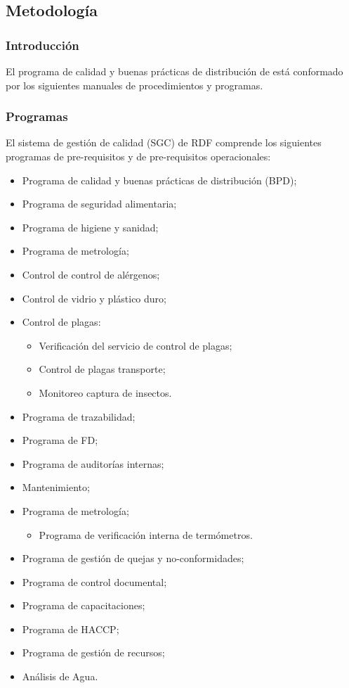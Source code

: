 \subsection{Metodología}

\subsubsection{Introducción}

El programa de calidad y buenas prácticas de distribución de  está conformado por los siguientes manuales de procedimientos y programas.

\subsubsection{Programas}
El sistema de gestión de calidad (SGC) de RDF comprende los siguientes programas de pre-requisitos y de pre-requisitos operacionales:
\begin{itemize}
	\item Programa de calidad y buenas prácticas de distribución (BPD);
	\item Programa de seguridad alimentaria;
	\item Programa de higiene y sanidad;
	\item Programa de metrología;
	\item Control de control de alérgenos;
	\item Control de vidrio y plástico duro;
	\item Control de plagas:
	\begin{itemize}
		\item Verificación del servicio de control de plagas;
		\item Control de plagas transporte;
		\item Monitoreo captura de insectos.
	\end{itemize}
	\item Programa de trazabilidad;
	\item Programa de \gls{FD};
	\item Programa de auditorías internas;
	\item Mantenimiento;
	\item Programa de metrología;
	\begin{itemize}
		\item Programa de verificación interna de termómetros.
	\end{itemize}
	\item Programa de gestión de quejas y no-conformidades;
	\item Programa de control documental;
	\item Programa de capacitaciones;
	\item Programa de \gls{HACCP};
	\item Programa de gestión de recursos;
	\item Análisis de Agua.
\end{itemize}

